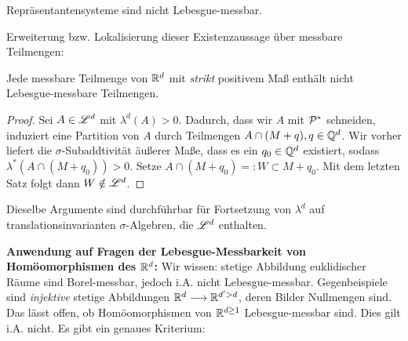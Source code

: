 \begin{korollar}
\begin{mdframed}
Repräsentantensysteme sind nicht Lebesgue-messbar.
\end{mdframed}
\end{korollar} 
Erweiterung bzw. Lokalisierung dieser Existenzaussage über messbare Teilmengen:
\begin{satz}
\begin{mdframed}
Jede messbare Teilmenge von $\mathbb{R}^d$ mit \emph{strikt} positivem Maß enthält nicht Lebesgue-messbare Teilmengen.
\end{mdframed}
\begin{proof}
Sei $A\in \mathscr{L}^d$ mit $\lambda^d(A)>0$. Dadurch, dass wir $A$ mit $\mathcal{P}^*$ schneiden, induziert eine Partition von $A$ durch Teilmengen $A\cap (M+q),q\in\mathbb{Q}^d$. Wir vorher liefert die $\sigma$-Subaddtivität äußerer Maße, dass es ein $q_0 \in \mathbb{Q}^d$ existiert, sodass $\lambda^*(A\cap (M+q_0))>0$. Setze $A\cap (M+q_0) =: W \subset M+q_0$. Mit dem letzten Satz folgt dann $W \notin \mathscr{L}^d$.
\end{proof}
\end{satz}

\begin{remark}
Dieselbe Argumente sind durchführbar für Fortsetzung von $\lambda^d$ auf translationsinvarianten $\sigma$-Algebren, die $\mathscr{L}^d$ enthalten.
\end{remark}
\textbf{Anwendung auf Fragen der Lebesgue-Messbarkeit von Homöomorphismen des $\mathbb{R}^d$: }
Wir wissen: stetige Abbildung euklidischer Räume sind Borel-messbar, jedoch i.A. nicht Lebesgue-messbar. Gegenbeispiele sind \emph{injektive} stetige Abbildungen $\mathbb{R}^d \longrightarrow \mathbb{R}^{d'>d}$, deren Bilder Nullmengen sind. Das lässt offen, ob Homöomorphismen von $\mathbb{R}^{d\geq 1}$ Lebesgue-messbar sind. Dies gilt i.A. nicht. Es gibt ein genaues Kriterium:

